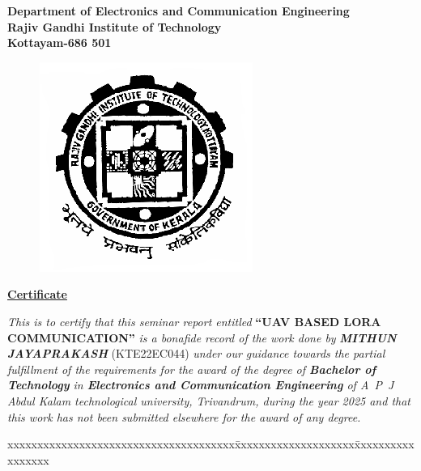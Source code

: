 \begin{titlepage}
\newpage
\begin{center}
\large{\textbf{Department of Electronics and Communication Engineering}\\ \textbf{Rajiv Gandhi Institute of Technology\\Kottayam-686 501}}\\
\end{center}
\begin{figure}[h]
\begin{center}
\includegraphics[width=0.17\paperwidth, height=0.17\paperheight,keepaspectratio]{logo.png}
\end{center}
\end{figure}
\begin{center}
\Large{\underline{\textbf{Certificate}}}%
\end{center}

\hskip12pt  \textit{This is to certify that this seminar report entitled }{\textbf {\textquotedblleft UAV BASED LORA COMMUNICATION\textquotedblright }} \textit{is a bonafide record of the work done by }\small{\emph{ \textbf{MITHUN JAYAPRAKASH }}}(KTE22EC044) \textit{under our guidance towards the partial fulfillment of the requirements for the award of the degree of \textbf{Bachelor of Technology} in {\textbf{Electronics and Communication Engineering}} of A~P~J Abdul Kalam technological university, Trivandrum, during the year 2025 and that this work has not been submitted elsewhere for the award of any degree.}

\vspace{.2in}
\begin{tabbing}
xxxxxxxxxxxxxxxxxxxxxxxxxxxxxxxxxxxxxx\= xxxxxxxxxxxxxxxxxxxx\=xxxxxxxxxxxxxxxxx \kill
 

\end{tabbing}
\end{titlepage}
